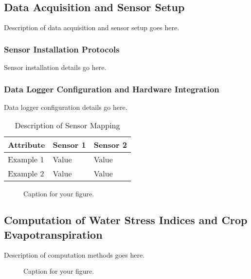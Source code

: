 \documentclass[12pt]{article}
\begin{document}
\subsection{Data Acquisition and Sensor Setup}

Description of data acquisition and sensor setup goes here.

\subsubsection{Sensor Installation Protocols}

Sensor installation details go here.

\subsubsection{Data Logger Configuration and Hardware Integration}

Data logger configuration details go here.

\begin{table}[ht]
  \centering
  \caption{Description of Sensor Mapping}
  \label{tab:sensor-mapping}
  \begin{tabular}{|l|l|l|}
  \hline
  \textbf{Attribute} & \textbf{Sensor 1} & \textbf{Sensor 2} \\ \hline
  Example 1 & Value & Value \\ \hline
  Example 2 & Value & Value \\ \hline
  \end{tabular}
\end{table}

\begin{figure}[htbp]
    \centering
    \caption{Caption for your figure.}
    \label{fig:sensor-mapping}
\end{figure}

\subsection{Computation of Water Stress Indices and Crop Evapotranspiration}

Description of computation methods goes here.

\begin{figure}[htbp]
    \centering
    \caption{Caption for your figure.}
    \label{fig:cloud-functions}
\end{figure}
\end{document}
